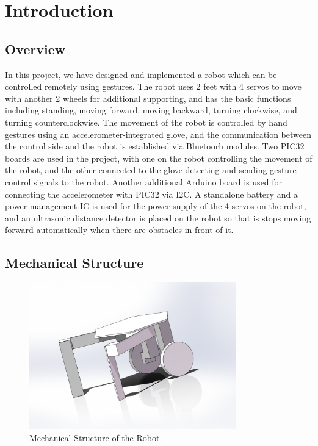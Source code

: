 \documentclass[a4paper]{article}
\begin{document}
\section{Introduction}
\subsection{Overview}
In this project, we have designed and implemented a robot which can be controlled remotely using gestures. The robot uses 2 feet with 4 servos to move with another 2 wheels for additional supporting, and has the basic functions including standing, moving forward, moving backward, turning clockwise, and turning counterclockwise. The movement of the robot is controlled by hand gestures using an accelerometer-integrated glove, and the communication between the control side and the robot is established via Bluetoorh modules. Two PIC32 boards are used in the project, with one on the robot controlling the movement of the robot, and the other connected to the glove detecting and sending gesture control signals to the robot. Another additional Arduino board is used for connecting the accelerometer with PIC32 via I2C. A standalone battery and a power management IC is used for the power supply of the 4 servos on the robot, and an ultrasonic distance detector is placed on the robot so that is stops moving forward automatically when there are obstacles in front of it. 
\subsection{Mechanical Structure}
\begin{figure}[H]
    \centering
    \includegraphics[width=0.8\textwidth]{Robot.pdf}
    \caption{Mechanical Structure of the Robot.}
\end{figure}
\end{document}
